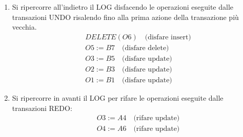 \documentclass[a4paper,twoside]{article}
\begin{document}
\begin{exercise}
\begin{enumerate}
    \item Si ripercorre all'indietro il LOG disfacendo le operazioni eseguite dalle
      transazioni UNDO risalendo fino alla prima azione della transazione più vecchia.
      \[
        \begin{aligned}
          &DELETE(O6) \quad \text{(disfare insert)} \\
          &O5 := B7 \quad \text{(disfare delete)} \\
          &O3 := B5 \quad \text{(disfare update)} \\
          &O2 := B3 \quad \text{(disfare update)} \\
          &O1 := B1 \quad \text{(disfare update)}
        \end{aligned}
      \] 

    \item Si ripercorre in avanti il LOG per rifare le operazioni eseguite dalle
      transazioni REDO:
      \[
        \begin{aligned}
          &O3 := A4 \quad \text{(rifare update)} \\
          &O4 := A6 \quad \text{(rifare update)} \\
        \end{aligned}
      \]
  \end{enumerate}
\end{exercise}
\end{document}
